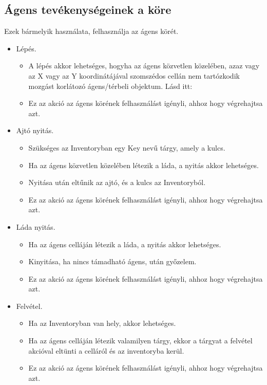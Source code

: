 \subsection{Ágens tevékenységeinek a köre}

\noindent Ezek bármelyik használata, felhasználja az ágens körét.

\begin{itemize}

    \item Lépés. 
    
    \begin{itemize}
        \item A lépés akkor lehetséges, hogyha az ágens közvetlen közelében, azaz vagy az X vagy az Y koordinátájával szomszédos cellán nem tartózkodik mozgást korlátozó ágens/térbeli objektum. Lásd itt: 
        \item Ez az akció az ágens körének felhasználást igényli, ahhoz hogy végrehajtsa azt.
    \end{itemize}

    \item Ajtó nyitás. 
    
    \begin{itemize}
        \item Szükséges az Inventoryban egy Key nevű tárgy, amely a kulcs.
        \item Ha az ágens közvetlen közelében létezik a láda, a nyitás akkor lehetséges.
        \item Nyitása után eltűnik az ajtó, és a kulcs az Inventoryból.
        \item Ez az akció az ágens körének felhasználást igényli, ahhoz hogy végrehajtsa azt.
    \end{itemize}

    \item Láda nyitás. 
    
    \begin{itemize}
        \item Ha az ágens celláján létezik a láda, a nyitás akkor lehetséges.
        \item Kinyitása, ha nincs támadható ágens, után győzelem.
        \item Ez az akció az ágens körének felhasználást igényli, ahhoz hogy végrehajtsa azt.
    \end{itemize}

    \item Felvétel. 
    
    \begin{itemize}
        \item Ha az Inventoryban van hely, akkor lehetséges.
        \item Ha az ágens celláján létezik valamilyen tárgy, ekkor a tárgyat a felvétel akcióval eltünti a celláról és az inventoryba kerül.
        \item Ez az akció az ágens körének felhasználást igényli, ahhoz hogy végrehajtsa azt.
    \end{itemize}


\end{itemize}
